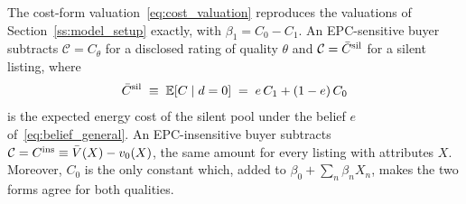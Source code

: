 \label{lem:cost_form}
The cost-form valuation~\eqref{eq:cost_valuation} reproduces the valuations of Section~\ref{ss:model_setup} exactly, with $\beta_1=C_0-C_1$. An EPC-sensitive buyer subtracts $\mathcal C=C_\theta$ for a disclosed rating of quality $\theta$ and $\mathcal C=\bar C^{\rm sil}$ for a silent listing, where
\begin{equation}
    \bar C^{\rm sil}\;\equiv\;\mathbb E[C\mid d=0]\;=\;e\,C_1+(1-e)\,C_0
    \label{eq:csil}
\end{equation}
is the expected energy cost of the silent pool under the belief $e$ of~\eqref{eq:belief_general}. An EPC-insensitive buyer subtracts $\mathcal C=C^{\rm ins}\equiv\bar V(X)-v_0(X)$, the same amount for every listing with attributes $X$. Moreover, $C_0$ is the only constant which, added to $\beta_0+\sum_n\beta_nX_n$, makes the two forms agree for both qualities.
